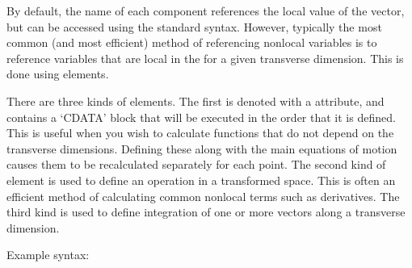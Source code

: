 \documentclass[letterpaper,10pt,english]{sphinxmanual}
\begin{document}
\ignorespaces 
\sphinxAtStartPar
By default, the name of each component references the local value of the vector, but {\hyperref[\detokenize{reference_elements:referencingnonlocal}]{}} can be accessed using the standard syntax.  However, typically the most common (and most efficient) method of referencing nonlocal variables is to reference variables that are local in the {\hyperref[\detokenize{reference_elements:transforms}]{}} for a given transverse dimension.  This is done using  elements.

\ignorespaces {}\label{\detokenize{reference_elements:operatorelement}}
\ignorespaces 
\sphinxAtStartPar
There are three kinds of  elements.  The first is denoted with a  attribute, and contains a ‘CDATA’ block that will be executed in the order that it is defined.  This is useful when you wish to calculate functions that do not depend on the transverse dimensions.  Defining these along with the main equations of motion causes them to be recalculated separately for each point.  The second kind of  element is used to define an operation in a transformed space.  This is often an efficient method of calculating common nonlocal terms such as derivatives.  The third kind is used to define integration of one or more vectors along a transverse dimension.

\sphinxAtStartPar
Example syntax:
\end{document}
